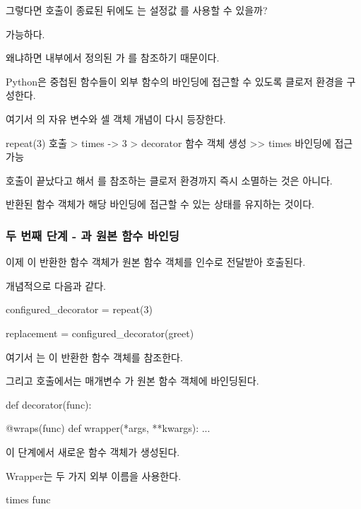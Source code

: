 그렇다면  호출이 종료된 뒤에도 는 설정값 를 사용할 수 있을까?

가능하다.

왜냐하면  내부에서 정의된 가 를 참조하기 때문이다.

Python은 중첩된 함수들이 외부 함수의 바인딩에 접근할 수 있도록 클로저 환경을 구성한다.

여기서 의 자유 변수와 셀 객체 개념이 다시 등장한다.

\begin{dhkdir}[in=6]
repeat(3) 호출
> times -> 3
> decorator 함수 객체 생성
>> times 바인딩에 접근 가능
\end{dhkdir}

 호출이 끝났다고 해서 를 참조하는 클로저 환경까지 즉시 소멸하는 것은 아니다.

반환된 함수 객체가 해당 바인딩에 접근할 수 있는 상태를 유지하는 것이다.

\subsubsection{두 번째 단계 - 과 원본 함수 바인딩}

이제 이 반환한 함수 객체가 원본  함수 객체를 인수로 전달받아 호출된다.

개념적으로 다음과 같다.

\begin{dhkcode}
configured_decorator = repeat(3)

replacement = configured_decorator(greet)
\end{dhkcode}

여기서 는 이 반환한  함수 객체를 참조한다.

그리고  호출에서는 매개변수 가 원본  함수 객체에 바인딩된다.

\begin{dhkcode}
def decorator(func):

    @wraps(func)
    def wrapper(*args, **kwargs):
        ...
\end{dhkcode}

이 단계에서 새로운  함수 객체가 생성된다.

Wrapper는 두 가지 외부 이름을 사용한다.

\begin{dhkzsh}
times
func
\end{dhkzsh}

